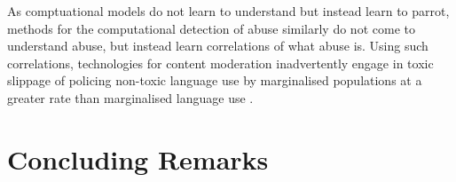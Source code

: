 As comptuational models do not learn to understand \citep{Bender:2020} but instead learn to parrot, methods for the computational detection of abuse similarly do not come to understand abuse, but instead learn correlations of what abuse is. Using such correlations, technologies for content moderation inadvertently engage in toxic slippage of policing non-toxic language use by marginalised populations at a greater rate than marginalised language use \cite{Oliva:2020}.

\section{Concluding Remarks}

